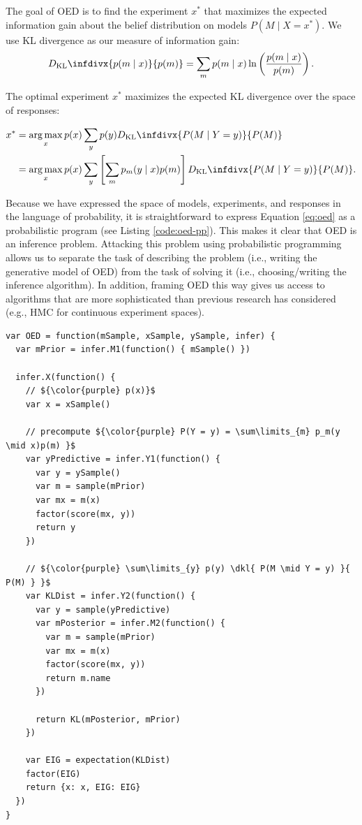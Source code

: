 \documentclass{article}
\newcommand{\dkl}{D_\mathrm{KL}\infdivx}
\DeclareMathOperator*{\argmax}{arg\,max}
\begin{document}
The goal of OED is to find the experiment $x^{*}$ that maximizes the expected information gain about the belief distribution on models $P(M \mid X = x^{*})$.
We use KL divergence as our measure of information gain:
\begin{align}
  \dkl{ p(m \mid x) }{ p(m) }  = \sum\limits_m p(m \mid x) \ln \left( \frac{p(m \mid x)}{p(m)}\right). \label{eq:kl}
\end{align}

The optimal experiment $x^*$ maximizes the expected KL divergence over the space of responses:

\begin{align}
x^{*} &= \argmax_{x} p(x) \sum\limits_{y} p(y) \dkl{ P(M \mid Y = y) }{ P(M) } \notag \\
    &= \argmax_{x} p(x) \sum\limits_{y} \left[\sum\limits_{m} p_m(y \mid x)p(m)\right] \dkl{P(M \mid Y = y)}{P(M)}. \label{eq:oed}
\end{align}

Because we have expressed the space of models, experiments, and responses in the language of probability, it is straightforward to express Equation \ref{eq:oed} as a probabilistic program (see Listing \ref{code:oed-pp}).
This makes it clear that OED is an inference problem.
Attacking this problem using probabilistic programming allows us to separate the task of describing the problem (i.e., writing the generative model of OED) from the task of solving it (i.e., choosing/writing the inference algorithm).
In addition, framing OED this way gives us access to algorithms that are more sophisticated than previous research has considered  (e.g., HMC for continuous experiment spaces).

\begin{minipage}{\linewidth}
\begin{lstlisting}[mathescape, label={code:oed-pp}, caption = {OED implementation. For clarity, we have omitted some book-keeping details.}]
var OED = function(mSample, xSample, ySample, infer) {
  var mPrior = infer.M1(function() { mSample() })

  infer.X(function() {
    // ${\color{purple} p(x)}$
    var x = xSample()

    // precompute ${\color{purple} P(Y = y) = \sum\limits_{m} p_m(y \mid x)p(m) }$
    var yPredictive = infer.Y1(function() {
      var y = ySample()
      var m = sample(mPrior)
      var mx = m(x)
      factor(score(mx, y))
      return y
    })

    // ${\color{purple} \sum\limits_{y} p(y) \dkl{ P(M \mid Y = y) }{ P(M) } }$
    var KLDist = infer.Y2(function() {
      var y = sample(yPredictive)
      var mPosterior = infer.M2(function() {
        var m = sample(mPrior)
        var mx = m(x)
        factor(score(mx, y))
        return m.name
      })

      return KL(mPosterior, mPrior)
    })

    var EIG = expectation(KLDist)
    factor(EIG)
    return {x: x, EIG: EIG}
  })
}

\end{lstlisting}
\end{minipage}
\end{document}
